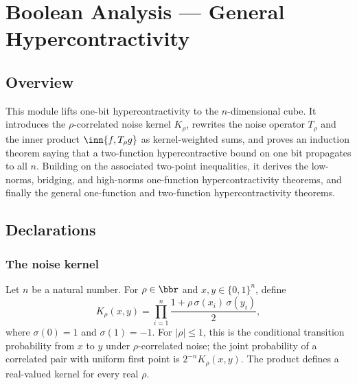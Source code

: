 \chapter{Boolean Analysis — General Hypercontractivity}
\section{Overview}

This module lifts one-bit hypercontractivity to the $n$-dimensional cube. It introduces
the $\rho$-correlated noise kernel $K_\rho$, rewrites the noise operator $T_\rho$ and the
inner product $\inn{f, T_\rho g}$ as kernel-weighted sums, and proves an induction theorem
saying that a two-function hypercontractive bound on one bit propagates to all $n$. Building
on the associated two-point inequalities, it derives the low-norms, bridging, and high-norms
one-function hypercontractivity theorems, and finally the general one-function and
two-function hypercontractivity theorems.

\section{Declarations}

\subsection{The noise kernel}

\begin{definition}
\label{BooleanAnalysis.Hypercontractivity.noiseKernel}
\leanok
{}
Let $n$ be a natural number. For $\rho \in \bbr$ and $x,y\in\{0,1\}^n$, define
\[
  K_\rho(x,y)=\prod_{i=1}^{n}\frac{1+\rho\,\sigma(x_i)\,\sigma(y_i)}{2},
\]
where $\sigma(0)=1$ and $\sigma(1)=-1$. For $|\rho|\le1$, this is the conditional
transition probability from $x$ to $y$ under $\rho$-correlated noise; the joint
probability of a correlated pair with uniform first point is $2^{-n}K_\rho(x,y)$.
The product defines a real-valued kernel for every real $\rho$.
\end{definition}

